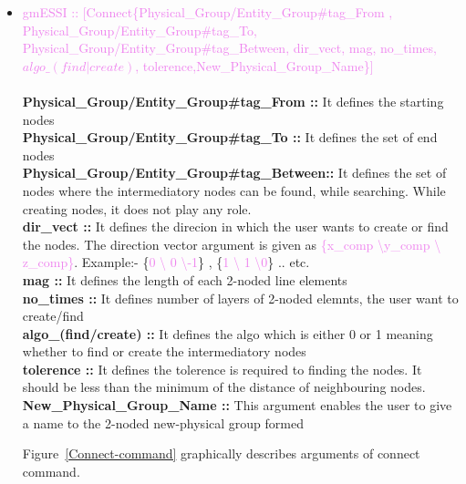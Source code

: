 \documentclass[11pt]{article}
\begin{document}
  \begin{itemize}

    \item \textcolor{violet}{gmESSI :: [Connect\{Physical\_Group/Entity\_Group\#tag\_From , Physical\_Group/Entity\_Group\#tag\_To, Physical\_Group/Entity\_Group\#tag\_Between, dir\_vect, mag, no\_times, $algo\_(find|create)$, tolerence,New\_Physical\_Group\_Name\}]} \\ \\ 
          \textbf{Physical\_Group/Entity\_Group\#tag\_From ::} It defines the starting nodes \\
          \textbf{Physical\_Group/Entity\_Group\#tag\_To ::}  It defines the set of end nodes\\
          \textbf{Physical\_Group/Entity\_Group\#tag\_Between::}  It defines the set of nodes where the intermediatory nodes can be found, while searching. While creating nodes, it does not play any role.\\
          \textbf{dir\_vect ::} It defines the direcion in which the user wants
          to create or find the nodes. The direction vector argument is given
          as \textcolor{violet}{\{x_comp  \textbackslash y_comp \textbackslash
          z_comp\}}.
          Example:- \{\textcolor{violet}{0 \textbackslash
          0 \textbackslash -1}\} , \{\textcolor{violet}{1 \textbackslash
          1 \textbackslash 0}\} .. etc.\\
          \textbf{mag ::} It defines the length of each 2-noded line elements \\ 
          \textbf{no\_times ::} It defines number of layers of 2-noded elemnts, the user want to create/find\\
          \textbf{algo\_(find/create) ::} It defines the algo which is either 0 or 1 meaning whether to find or create the intermediatory nodes\\
          \textbf{tolerence ::} It defines the tolerence is required to finding the nodes. It should be less than the minimum of the distance of neighbouring nodes. \\
          \textbf{New\_Physical\_Group\_Name ::} This argument enables the user to give a name to the 2-noded new-physical group formed

          Figure~\ref{Connect-command} graphically describes arguments of connect command.


\end{itemize}
\end{document}
